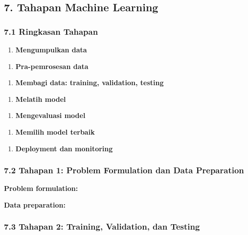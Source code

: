 \documentclass[12pt,a4paper]{article}
\begin{document}
\subsection{7. Tahapan Machine Learning}

\subsubsection{7.1 Ringkasan Tahapan}

\begin{enumerate}
\item \textbf{Mengumpulkan data}
\end{enumerate}

\begin{enumerate}
\item \textbf{Pra-pemrosesan data}
\end{enumerate}

\begin{enumerate}
\item \textbf{Membagi data: training, validation, testing}
\end{enumerate}

\begin{enumerate}
\item \textbf{Melatih model}
\end{enumerate}

\begin{enumerate}
\item \textbf{Mengevaluasi model}
\end{enumerate}

\begin{enumerate}
\item \textbf{Memilih model terbaik}
\end{enumerate}

\begin{enumerate}
\item \textbf{Deployment dan monitoring}
\end{enumerate}


\subsubsection{7.2 Tahapan 1: Problem Formulation dan Data Preparation}

\textbf{Problem formulation:}


\textbf{Data preparation:}


\subsubsection{7.3 Tahapan 2: Training, Validation, dan Testing}
\end{document}
